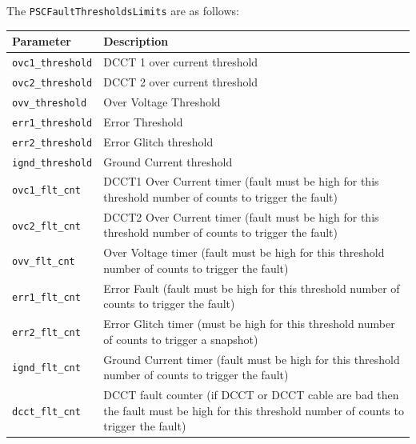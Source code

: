 \newpage
The \texttt{PSCFaultThresholdsLimits} are as follows:
\begin{table}[H]
	\centering
	\begin{tabular}{p{4cm}p{10cm}}
		\toprule
		\textbf{Parameter} & \textbf{Description} \\
		\midrule
		\texttt{ovc1\_threshold} &
		DCCT 1 over current threshold\\

		\texttt{ovc2\_threshold} &
        DCCT 2 over current threshold\\

		\texttt{ovv\_threshold} &
        Over Voltage Threshold\\

		\texttt{err1\_threshold} &
		Error Threshold\\

		\texttt{err2\_threshold} &
		Error Glitch threshold\\

		\texttt{ignd\_threshold} &
		Ground Current threshold\\

		\texttt{ovc1\_flt\_cnt} &
		DCCT1 Over Current timer (fault must be high for this threshold number of counts to trigger the fault)\\

		\texttt{ovc2\_flt\_cnt} &
		DCCT2 Over Current timer (fault must be high for this threshold number of counts to trigger the fault)\\

		\texttt{ovv\_flt\_cnt} &
		Over Voltage timer (fault must be high for this threshold number of counts to trigger the fault)\\

		\texttt{err1\_flt\_cnt} &
		Error Fault (fault must be high for this threshold number of counts to trigger the fault)\\

		\texttt{err2\_flt\_cnt} &
		Error Glitch timer (must be high for this threshold number of counts to trigger a snapshot)\\

		\texttt{ignd\_flt\_cnt} &
		Ground Current timer (fault must be high for this threshold number of counts to trigger the fault)\\

		\texttt{dcct\_flt\_cnt} &
		DCCT fault counter (if DCCT or DCCT cable are bad then the fault must be high for this threshold number of counts to trigger the fault)\\


\end{tabular}
\end{table}
